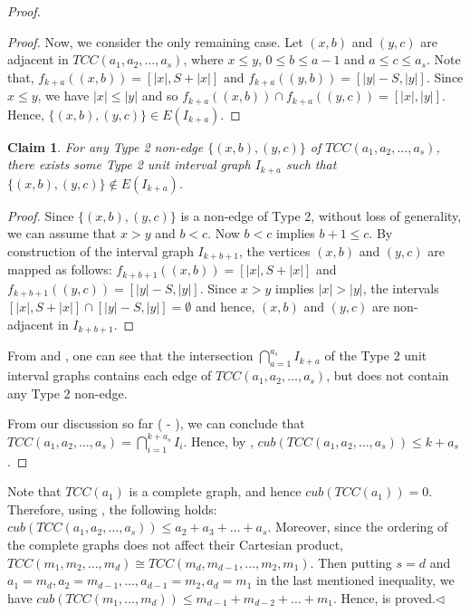\documentclass[twoside, 11pt]{article}
\newtheorem{claim}{Claim}
\newcommand{\TT}{TCC(a_1,a_2,\dots,a_s)}
\newcommand{\M}{TCC(m_1,m_2,\dots,m_d)}
\begin{document}
\begin{proof}
\begin{proof}
    Now, we consider the only remaining case. Let $(x,b)$ and $(y,c)$ are adjacent in $\TT$, where $x \leq y$, $0 \leq b \leq a-1$ and $a \leq c \leq a_s$. Note that, $f_{k+a}((x,b))=[|x|,S + |x|]$ and $f_{k+a}((y,b))=[|y|-S,|y|]$. Since $x \leq y$, we have $|x| \leq |y|$ and so $f_{k+a}((x,b)) \cap f_{k+a}((y,c))= [|x|,|y|]$. Hence, $\{(x,b),(y,c)\} \in E(I_{k+a})$.
\end{proof}

\begin{claim}\label{Type 2 interval graphs and non-edge}
    For any Type 2 non-edge $\{(x,b),(y,c)\}$ of $\TT$,
    there exists some Type 2 unit interval graph $I_{k+a}$ such that $\{(x,b),(y,c)\} \notin E(I_{k+a})$.
\end{claim}
\begin{proof}
    Since $\{(x,b),(y,c)\}$ is a non-edge of Type 2, without loss of generality, we can assume that $x >y$ and $b < c$. Now $b < c$ implies $b+1 \leq c$. By construction of the interval graph $I_{k+b+1}$, the vertices $(x,b)$ and $(y,c)$ are mapped as follows: $f_{k+b+1}((x,b))=[|x|,S+|x|]$ and $f_{k+b+1}((y,c))=[|y|-S,|y|]$. Since $x > y$ implies $|x| > |y|$, the intervals $[|x|,S+|x|]\cap [|y|-S,|y|] = \emptyset$ and hence, $(x,b)$ and $(y,c)$ are non-adjacent in $I_{k+b+1}$.
\end{proof}

  From  and , one can see that the intersection $\bigcap_{a=1}^{a_s}I_{k+a}$ of the Type 2 unit interval graphs contains each edge of $\TT$, but does not contain any Type 2 non-edge.
  
  From our discussion so far ( - ), we can conclude that $\TT=\bigcap_{i=1}^{k+a_s}I_i$. Hence, by , $cub(\TT) \leq k+a_s$. 
\end{proof}

Note that $TCC(a_1)$ is a complete graph, and hence $cub(TCC(a_1))=0$. Therefore, using , the following holds: $cub(\TT) \leq a_2+a_3+\dots + a_{s}$. Moreover, since the ordering of the complete graphs does not affect their Cartesian product, $\M \cong TCC(m_d,m_{d-1},\dots,m_2,m_1)$. Then putting $s=d$ and $a_1=m_d,a_2=m_{d-1},\dots,a_{d-1}=m_2,a_d=m_1$ in the last mentioned inequality, we have $cub(TCC(m_1,\dots,m_d)) \leq m_{d-1}+m_{d-2}+\dots + m_1$. Hence,  is proved.\hfill $\lhd$
\end{document}
